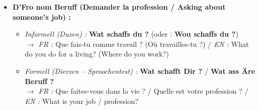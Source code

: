 \begin{itemize}
    \item \textbf{D'Fro nom Beruff (Demander la profession / Asking about someone's job) :}
    \begin{itemize}
        \item \textit{Informell (Duzen) :} \textbf{Wat schaffs du ?} (oder : \textbf{Wou schaffs du ?}) \\
        $\rightarrow$ \textit{FR :} Que fais-tu comme travail ? (Où travailles-tu ?) / \textit{EN :} What do you do for a living? (Where do you work?)
        \item \textit{Formell (Dierzen -- Sproochentest) :} \textbf{Wat schafft Dir ?} / \textbf{Wat ass Äre Beruff ?} \\
        $\rightarrow$ \textit{FR :} Que faites-vous dans la vie ? / Quelle est votre profession ? / \textit{EN :} What is your job / profession?
    \end{itemize}

    \vspace{0.3em}


\end{itemize}
